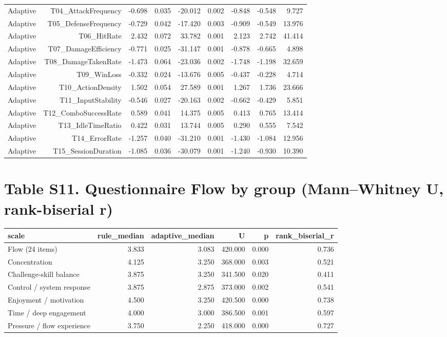 \documentclass[10pt]{article}
\begin{document}
{\begin{longtable}{lrrrrrrrr}
Adaptive & T04\_AttackFrequency & -0.698 & 0.035 & -20.012 & 0.002 & -0.848 & -0.548 & 9.727 \\
Adaptive & T05\_DefenseFrequency & -0.729 & 0.042 & -17.420 & 0.003 & -0.909 & -0.549 & 13.976 \\
Adaptive & T06\_HitRate & 2.432 & 0.072 & 33.782 & 0.001 & 2.123 & 2.742 & 41.414 \\
Adaptive & T07\_DamageEfficiency & -0.771 & 0.025 & -31.147 & 0.001 & -0.878 & -0.665 & 4.898 \\
Adaptive & T08\_DamageTakenRate & -1.473 & 0.064 & -23.036 & 0.002 & -1.748 & -1.198 & 32.659 \\
Adaptive & T09\_WinLoss & -0.332 & 0.024 & -13.676 & 0.005 & -0.437 & -0.228 & 4.714 \\
Adaptive & T10\_ActionDensity & 1.502 & 0.054 & 27.589 & 0.001 & 1.267 & 1.736 & 23.666 \\
Adaptive & T11\_InputStability & -0.546 & 0.027 & -20.163 & 0.002 & -0.662 & -0.429 & 5.851 \\
Adaptive & T12\_ComboSuccessRate & 0.589 & 0.041 & 14.375 & 0.005 & 0.413 & 0.765 & 13.414 \\
Adaptive & T13\_IdleTimeRatio & 0.422 & 0.031 & 13.744 & 0.005 & 0.290 & 0.555 & 7.542 \\
Adaptive & T14\_ErrorRate & -1.257 & 0.040 & -31.210 & 0.001 & -1.430 & -1.084 & 12.956 \\
Adaptive & T15\_SessionDuration & -1.085 & 0.036 & -30.079 & 0.001 & -1.240 & -0.930 & 10.390 \\
\bottomrule
\end{longtable}}

\section*{Table S11. Questionnaire Flow by group (Mann--Whitney U, rank-biserial r)}
{\scriptsize\setlength{\tabcolsep}{3pt}\begin{longtable}{lrrrrr}
\toprule
scale & rule\_median & adaptive\_median & U & p & rank\_biserial\_r \\
\midrule
\endhead
Flow (24 items) & 3.833 & 3.083 & 420.000 & 0.000 & 0.736 \\
Concentration & 4.125 & 3.250 & 368.000 & 0.003 & 0.521 \\
Challenge-skill balance & 3.875 & 3.250 & 341.500 & 0.020 & 0.411 \\
Control / system response & 3.875 & 2.875 & 373.000 & 0.002 & 0.541 \\
Enjoyment / motivation & 4.500 & 3.250 & 420.500 & 0.000 & 0.738 \\
Time / deep engagement & 4.000 & 3.000 & 386.500 & 0.001 & 0.597 \\
Pressure / flow experience & 3.750 & 2.250 & 418.000 & 0.000 & 0.727 \\
\bottomrule
\end{longtable}}
\end{document}
